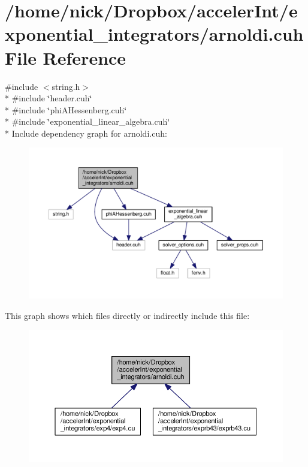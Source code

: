 \hypertarget{arnoldi_8cuh}{}\section{/home/nick/\+Dropbox/acceler\+Int/exponential\+\_\+integrators/arnoldi.cuh File Reference}
\label{arnoldi_8cuh}
{\ttfamily \#include $<$string.\+h$>$}\\*
{\ttfamily \#include \char`\"{}header.\+cuh\char`\"{}}\\*
{\ttfamily \#include \char`\"{}phi\+A\+Hessenberg.\+cuh\char`\"{}}\\*
{\ttfamily \#include \char`\"{}exponential\+\_\+linear\+\_\+algebra.\+cuh\char`\"{}}\\*
Include dependency graph for arnoldi.\+cuh\+:
\nopagebreak
\begin{figure}[H]
\begin{center}
\leavevmode
\includegraphics[width=350pt]{arnoldi_8cuh__incl}
\end{center}
\end{figure}
This graph shows which files directly or indirectly include this file\+:
\nopagebreak
\begin{figure}[H]
\begin{center}
\leavevmode
\includegraphics[width=350pt]{arnoldi_8cuh__dep__incl}
\end{center}
\end{figure}
